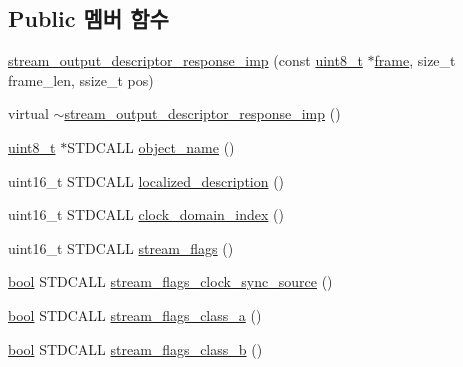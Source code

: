 \subsection*{Public 멤버 함수}
\begin{DoxyCompactItemize}
\item 
\hyperlink{classavdecc__lib_1_1stream__output__descriptor__response__imp_a67e7748648dbc6ffe7d88f3dc5093021}{stream\+\_\+output\+\_\+descriptor\+\_\+response\+\_\+imp} (const \hyperlink{stdint_8h_aba7bc1797add20fe3efdf37ced1182c5}{uint8\+\_\+t} $\ast$\hyperlink{gst__avb__playbin_8c_ac8e710e0b5e994c0545d75d69868c6f0}{frame}, size\+\_\+t frame\+\_\+len, ssize\+\_\+t pos)
\item 
virtual \hyperlink{classavdecc__lib_1_1stream__output__descriptor__response__imp_a7d1513478883de92e7d97995b7b5bc0a}{$\sim$stream\+\_\+output\+\_\+descriptor\+\_\+response\+\_\+imp} ()
\item 
\hyperlink{stdint_8h_aba7bc1797add20fe3efdf37ced1182c5}{uint8\+\_\+t} $\ast$S\+T\+D\+C\+A\+LL \hyperlink{classavdecc__lib_1_1stream__output__descriptor__response__imp_a15837e3eb254ad44812cb766ae8cd53c}{object\+\_\+name} ()
\item 
uint16\+\_\+t S\+T\+D\+C\+A\+LL \hyperlink{classavdecc__lib_1_1stream__output__descriptor__response__imp_aa94307532fbb37e2f986fee8fec79373}{localized\+\_\+description} ()
\item 
uint16\+\_\+t S\+T\+D\+C\+A\+LL \hyperlink{classavdecc__lib_1_1stream__output__descriptor__response__imp_a25f4f17a510b3f05e97806cd40751774}{clock\+\_\+domain\+\_\+index} ()
\item 
uint16\+\_\+t S\+T\+D\+C\+A\+LL \hyperlink{classavdecc__lib_1_1stream__output__descriptor__response__imp_ae2c7ef21d6748f8c665984ab3328f75f}{stream\+\_\+flags} ()
\item 
\hyperlink{avb__gptp_8h_af6a258d8f3ee5206d682d799316314b1}{bool} S\+T\+D\+C\+A\+LL \hyperlink{classavdecc__lib_1_1stream__output__descriptor__response__imp_af9491e9352fca611fcb8e87f5cedc33b}{stream\+\_\+flags\+\_\+clock\+\_\+sync\+\_\+source} ()
\item 
\hyperlink{avb__gptp_8h_af6a258d8f3ee5206d682d799316314b1}{bool} S\+T\+D\+C\+A\+LL \hyperlink{classavdecc__lib_1_1stream__output__descriptor__response__imp_a1649becad8758c57728299dd945d1e8b}{stream\+\_\+flags\+\_\+class\+\_\+a} ()
\item 
\hyperlink{avb__gptp_8h_af6a258d8f3ee5206d682d799316314b1}{bool} S\+T\+D\+C\+A\+LL \hyperlink{classavdecc__lib_1_1stream__output__descriptor__response__imp_a1a27dcf14ebf83cc16b3cb8660b18ee4}{stream\+\_\+flags\+\_\+class\+\_\+b} ()

\end{DoxyCompactItemize}
